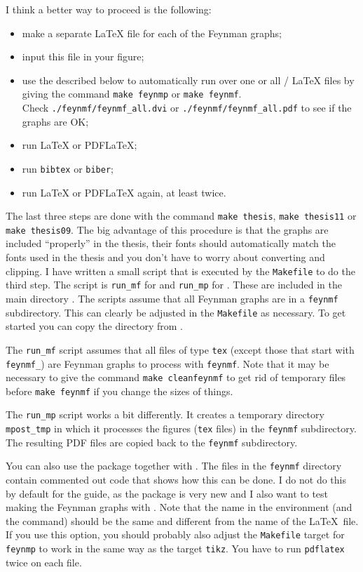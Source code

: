 I think a better way to proceed is the following:
\begin{itemize}
\item make a separate \LaTeX{} file for each of the Feynman graphs;
\item input this file in your figure;
\item use the  described below to automatically run
  over one or all / \LaTeX{} files by giving the
  command \texttt{make feynmp} or \texttt{make feynmf}.\\
  Check
  \texttt{./feynmf/feynmf\_all.dvi} or
  \texttt{./feynmf/feynmf\_all.pdf} to see if the graphs are OK;
\item run \LaTeX{} or PDF\LaTeX;
\item run \texttt{bibtex} or \texttt{biber};
\item run \LaTeX{} or PDF\LaTeX{} again, at least twice.
\end{itemize}
The last three steps are done with the command \texttt{make thesis},
\texttt{make thesis11} or
\texttt{make thesis09}.
The big advantage of this procedure is that the graphs are included
\enquote{properly} in the thesis, their fonts should automatically
match the fonts used in the thesis and you don't have to worry about
converting and clipping. I have written a small script that is
executed by the \texttt{Makefile} to do the third step.
The script is \texttt{run\_mf} for  and
\texttt{run\_mp} for . These are
included in the main directory .
The scripts assume that all Feynman graphs are in 
a \texttt{feynmf} subdirectory. This can clearly be
adjusted in the \texttt{Makefile} as necessary.
To get started you can copy the  directory from .

The \texttt{run\_mf} script assumes that all files of type
\texttt{tex} (except those that start with \texttt{feynmf\_}) are
Feynman graphs to process with \texttt{feynmf}. Note that it may be
necessary to give the command \texttt{make cleanfeynmf} to get rid of
temporary files before \texttt{make feynmf} if you change the sizes of
things.

The \texttt{run\_mp} script works a bit differently. It creates a
temporary directory \texttt{mpost\_tmp} in which it processes the
figures (\texttt{tex} files) in the \texttt{feynmf} subdirectory. The
resulting PDF files are copied back to the \texttt{feynmf}
subdirectory.

You can also use the package  together with
. The files in the \texttt{feynmf} directory contain
commented out code that shows how this can be done. I do not do this
by default for the guide, as the package is very new and I also want
to test making the Feynman graphs with . Note that
the name in the  environment (and the 
command) should be the same and different from the name of the \LaTeX\
file. If you use this option, you should probably also adjust the
\texttt{Makefile} target for \texttt{feynmp} to work in the same way
as the target \texttt{tikz}. You have to run \texttt{pdflatex} twice
on each file.

